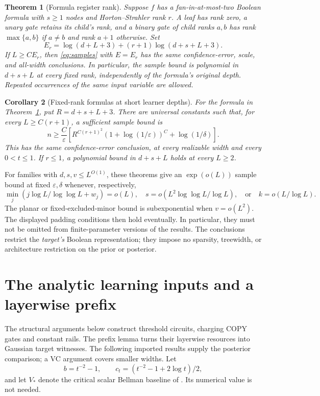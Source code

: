 \documentclass[11pt]{article}
\newtheorem{theorem}{Theorem}[section]
\newtheorem{corollary}[theorem]{Corollary}
\theoremstyle{remark}\newtheorem{remark}[theorem]{Remark}
\begin{document}
\begin{theorem}[Formula register rank]\label{thm:strahler}
Suppose $f$ has a fan-in-at-most-two Boolean formula with $s\ge1$
nodes and Horton--Strahler rank $r$. A leaf has rank zero, a unary
gate retains its child's rank, and a binary gate of child ranks
$a,b$ has rank $\max\{a,b\}$ if $a\ne b$ and rank $a+1$ otherwise.
Set
\[
 E_r=\log(d+L+3)+(r+1)\log(d+s+L+3).
\]
If $L\ge C E_r$, then \eqref{eq:samples} with $E=E_r$ has the same
confidence-error, scale, and all-width conclusions. In particular,
the sample bound is polynomial in $d+s+L$ at every fixed rank,
independently of the formula's original depth. Repeated occurrences
of the same input variable are allowed.
\end{theorem}

\begin{corollary}[Fixed-rank formulas at short learner depths]\label{cor:rankshort}
For the formula in Theorem~\ref{thm:strahler}, put $R=d+s+L+3$.
There are universal constants such that, for every $L\ge C(r+1)$,
a sufficient sample bound is
\[
 n\ge\frac C\varepsilon\left[
 R^{C(r+1)^2}(1+\log(1/\varepsilon))^C+\log(1/\delta)\right].
\]
This has the same confidence-error conclusion, at every realizable
width and every $0<t\le1$. If $r\le1$, a polynomial bound in
$d+s+L$ holds at every $L\ge2$.
\end{corollary}

For families with $d,s,v\le L^{O(1)}$, these theorems give an
$\exp(o(L))$ sample bound at fixed $\varepsilon,\delta$ whenever,
respectively,
\[
 \min_j(j\log L/\log\log L+w_j)=o(L),\quad
 s=o(L^2\log\log L/\log L),\quad\text{or}\quad
 k=o(L/\log L).
\]
The planar or fixed-excluded-minor bound is subexponential when
$v=o(L^2)$.
The displayed padding conditions then hold eventually. In particular,
they must not be omitted from finite-parameter versions of the results.
The conclusions restrict the \emph{target's} Boolean representation;
they impose no sparsity, treewidth, or architecture restriction on the
prior or posterior.

\section{The analytic learning inputs and a layerwise prefix}
The structural arguments below construct threshold circuits, charging
COPY gates and constant rails. The prefix lemma turns their layerwise
resources into Gaussian target witnesses. The following imported results
supply the posterior comparison; a VC argument covers smaller widths.
Let
\[
 b=t^{-2}-1,\qquad c_t=(t^{-2}-1+2\log t)/2,
\]
and let $V_*$ denote the critical scalar Bellman baseline of
\cite{critical,uniform}. Its numerical value is not needed.
\end{document}
